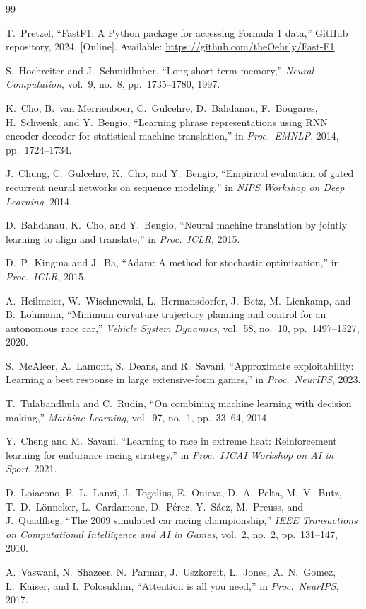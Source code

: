 \documentclass[12pt]{article}
\begin{document}
\begin{thebibliography}{99}

T.\ Pretzel, ``FastF1: A Python package for accessing Formula 1 data,'' GitHub repository, 2024. [Online]. Available: \url{https://github.com/theOehrly/Fast-F1}

S.\ Hochreiter and J.\ Schmidhuber, ``Long short-term memory,'' \textit{Neural Computation}, vol.\ 9, no.\ 8, pp.\ 1735--1780, 1997.

K.\ Cho, B.\ van Merrienboer, C.\ Gulcehre, D.\ Bahdanau, F.\ Bougares, H.\ Schwenk, and Y.\ Bengio, ``Learning phrase representations using RNN encoder-decoder for statistical machine translation,'' in \textit{Proc.\ EMNLP}, 2014, pp.\ 1724--1734.

J.\ Chung, C.\ Gulcehre, K.\ Cho, and Y.\ Bengio, ``Empirical evaluation of gated recurrent neural networks on sequence modeling,'' in \textit{NIPS Workshop on Deep Learning}, 2014.

D.\ Bahdanau, K.\ Cho, and Y.\ Bengio, ``Neural machine translation by jointly learning to align and translate,'' in \textit{Proc.\ ICLR}, 2015.

D.\ P.\ Kingma and J.\ Ba, ``Adam: A method for stochastic optimization,'' in \textit{Proc.\ ICLR}, 2015.

A.\ Heilmeier, W.\ Wischnewski, L.\ Hermansdorfer, J.\ Betz, M.\ Lienkamp, and B.\ Lohmann, ``Minimum curvature trajectory planning and control for an autonomous race car,'' \textit{Vehicle System Dynamics}, vol.\ 58, no.\ 10, pp.\ 1497--1527, 2020.

S.\ McAleer, A.\ Lamont, S.\ Deans, and R.\ Savani, ``Approximate exploitability: Learning a best response in large extensive-form games,'' in \textit{Proc.\ NeurIPS}, 2023.

T.\ Tulabandhula and C.\ Rudin, ``On combining machine learning with decision making,'' \textit{Machine Learning}, vol.\ 97, no.\ 1, pp.\ 33--64, 2014.

Y.\ Cheng and M.\ Savani, ``Learning to race in extreme heat: Reinforcement learning for endurance racing strategy,'' in \textit{Proc.\ IJCAI Workshop on AI in Sport}, 2021.

D.\ Loiacono, P.\ L.\ Lanzi, J.\ Togelius, E.\ Onieva, D.\ A.\ Pelta, M.\ V.\ Butz, T.\ D.\ L{\"{o}}nneker, L.\ Cardamone, D.\ Pérez, Y.\ S{\'{a}}ez, M.\ Preuss, and J.\ Quadflieg, ``The 2009 simulated car racing championship,'' \textit{IEEE Transactions on Computational Intelligence and AI in Games}, vol.\ 2, no.\ 2, pp.\ 131--147, 2010.

A.\ Vaswani, N.\ Shazeer, N.\ Parmar, J.\ Uszkoreit, L.\ Jones, A.\ N.\ Gomez, L.\ Kaiser, and I.\ Polosukhin, ``Attention is all you need,'' in \textit{Proc.\ NeurIPS}, 2017.

\end{thebibliography}
\end{document}
